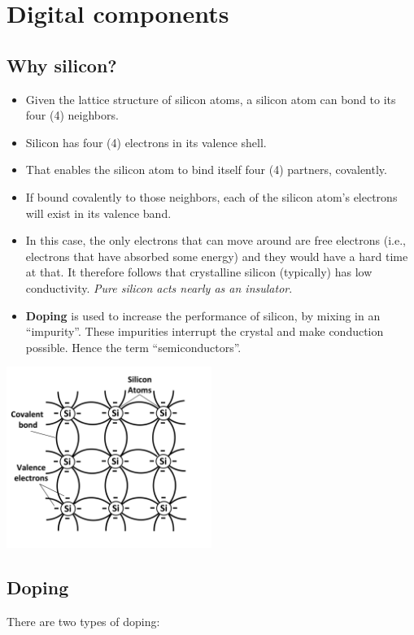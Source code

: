 \documentclass[11pt]{book}
\begin{document}
\newpage
\section{Digital components}
\subsection{Why silicon?}
\begin{itemize}
	\item Given the lattice structure of silicon atoms, a silicon atom can bond to its four (4) neighbors.
	\item Silicon has four (4) electrons in its valence shell.
	\item That enables the silicon atom to bind itself four (4) partners, covalently.  
	\item If bound covalently to those neighbors, each of the silicon atom's electrons will exist in its valence band.
	\item In this case, the only electrons that can move around are free electrons (i.e., electrons that have absorbed some energy) and they would have a hard time at that. It therefore follows that crystalline silicon (typically) has low conductivity. \textit{Pure silicon acts nearly as an insulator}.
	\item \textbf{Doping} is used to increase the performance of silicon, by mixing in an ``impurity''. These impurities interrupt the crystal and make conduction possible. Hence the term ``semiconductors''.
\end{itemize}

\begin{center}
	\includegraphics[width=0.5\textwidth]{figures/19.01.png}
\end{center}


\subsection{Doping}
There are two types of doping:
\end{document}
